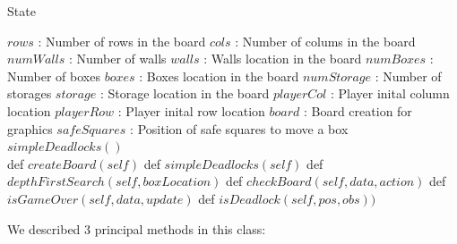 \documentclass{article}
\begin{document}
\begin{algorithm}
\caption{State}
\begin{algorithmic}
  \State $rows$ : Number of rows in the board
  \State $cols$ : Number of colums in the board
  \State $numWalls$ : Number of walls
  \State $walls$ : Walls location in the board
  \State $numBoxes$ : Number of boxes
  \State $boxes$ : Boxes location in the board
  \State $numStorage$ : Number of storages
  \State $storage$ : Storage location in the board
  \State $playerCol$ : Player inital column location 
  \State $playerRow$ : Player inital row location
  \State $board$ : Board creation for graphics
  \State $safeSquares$ : Position of safe squares to move a box
  \State $simpleDeadlocks()$ \\
  
  \State def $createBoard(self)$
  \State def $simpleDeadlocks(self)$
  \State def $depthFirstSearch(self, boxLocation)$
  \State def $checkBoard(self, data, action)$
  \State def $isGameOver(self, data, update)$
  \State def $isDeadlock(self, pos, obs))$
\EndStruct
\end{algorithmic}
\label{Class}
\end{algorithm}

We described 3 principal methods in this class:
    
\end{document}

